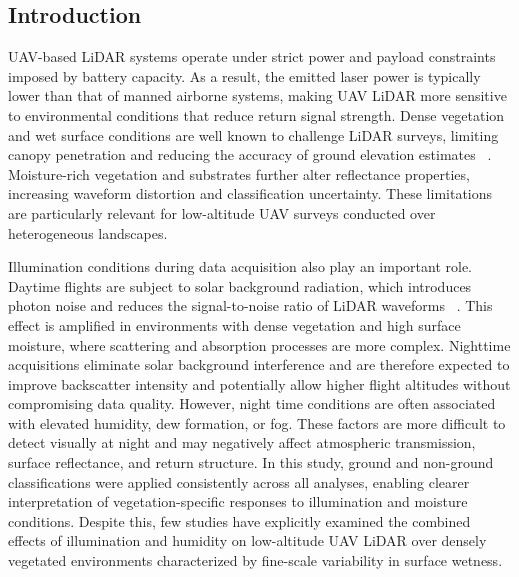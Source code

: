 \documentclass{isprs} %
\begin{document}
\sloppy

\subsection{Introduction}\label{sec:intro}

UAV-based LiDAR systems operate under strict power and payload constraints imposed by battery capacity. As a result, the emitted laser power is typically lower than that of manned airborne systems, making UAV LiDAR more sensitive to environmental conditions that reduce return signal strength. Dense vegetation and wet surface conditions are well known to challenge LiDAR surveys, limiting canopy penetration and reducing the accuracy of ground elevation estimates ~\cite{simpsonAssessmentErrorsCaused2017,coveneyAssociationElevationError2013,hopkinsonVegetationClassDependent2005,toyraAssessmentAirborneScanning2003}. Moisture-rich vegetation and substrates further alter reflectance properties, increasing waveform distortion and classification uncertainty. These limitations are particularly relevant for low-altitude UAV surveys conducted over heterogeneous landscapes.

Illumination conditions during data acquisition also play an important role. Daytime flights are subject to solar background radiation, which introduces photon noise and reduces the signal-to-noise ratio of LiDAR waveforms ~\cite{fengSystematicEvaluationMultiresolution2023,sunTechniqueSeparateLidar2016a}. This effect is amplified in environments with dense vegetation and high surface moisture, where scattering and absorption processes are more complex. Nighttime acquisitions eliminate solar background interference and are therefore expected to improve backscatter intensity and potentially allow higher flight altitudes without compromising data quality. However, night time conditions are often associated with elevated humidity, dew formation, or fog. These factors are more difficult to detect visually at night and may negatively affect atmospheric transmission, surface reflectance, and return structure. In this study, ground and non-ground classifications were applied consistently across all analyses, enabling clearer interpretation of vegetation-specific responses to illumination and moisture conditions. Despite this, few studies have explicitly examined the combined effects of illumination and humidity on low-altitude UAV LiDAR over densely vegetated environments characterized by fine-scale variability in surface wetness.
\end{document}

